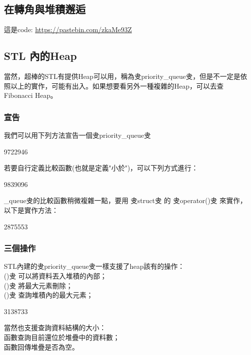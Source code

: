 \documentclass[main.tex]{subfiles}
\begin{document}
\subsection{在轉角與堆積邂逅}
這是code: \url{https://pastebin.com/zkaMe93Z}
\subsection{STL 內的Heap}
當然，超棒的STL有提供Heap可以用，稱為叏priority\_queue叏，但是不一定是依照以上的實作，可能有出入。如果想要看另外一種複雜的Heap，可以去查Fibonacci Heap。
\subsubsection{宣告}
我們可以用下列方法宣告一個叏priority\_queue叏
 \begin{C++}9722946\end{C++}
\indent\indent 若要自行定義比較函數(也就是定義"小於")，可以下列方式進行：
 \begin{C++}9839096\end{C++}
\indent{}\_queue叏的比較函數稍微複雜一點，要用 叏struct叏 的 叏operator()叏 來實作，以下是實作方法：
\begin{C++}2875553\end{C++}
\subsubsection{三個操作}
STL內建的叏priority\_queue叏一樣支援了heap該有的操作：\\
()叏  可以將資料丟入堆積的內部；\\
()叏 將最大元素刪除；\\
()叏 查詢堆積內的最大元素；\\
\begin{C++}3138733\end{C++}
\indent\indent 當然也支援查詢資料結構的大小：\\
 函數查詢目前還位於堆疊中的資料數；\\
 函數回傳堆疊是否為空。
\end{document}
